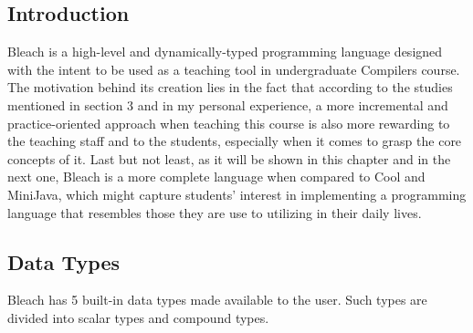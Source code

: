 \subsection{Introduction}
Bleach is a high-level and dynamically-typed programming language designed with the intent to be used as a teaching tool in undergraduate Compilers course. The motivation behind its creation lies in the fact that according to the studies mentioned in section 3 and in my personal experience, a more incremental and practice-oriented approach when teaching this course is also more rewarding to the teaching staff and to the students, especially when it comes to grasp the core concepts of it. Last but not least, as it will be shown in this chapter and in the next one, Bleach is a more complete language when compared to Cool and MiniJava, which might capture students' interest in implementing a programming language that resembles those they are use to utilizing in their daily lives.

\subsection{Data Types}
Bleach has 5 built-in data types made available to the user. Such types are divided into scalar types  and compound types.

